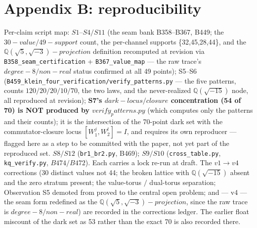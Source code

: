 \documentclass[11pt]{article}
\theoremstyle{plain}
\theoremstyle{definition}
\theoremstyle{remark}
\begin{document}
\section{Appendix B: reproducibility}

Per-claim script map: \(S1–S4/S11\) (the seam bank B358–B367, B449; the \(30-value/49-support\) count, the per-channel supports \{32,45,28,44\}, and the \(\mathbb{Q}(\sqrt{5},\sqrt{-3})-projection\) definition recomputed at revision via \texttt{B358\_seam\_certification} + \texttt{B367\_value\_map} — the raw trace's \(degree-8/non-real\) status confirmed at all 49 points); S5–S6 (\texttt{B459\_klein\_four\_verification/verify\_patterns.py} — the five patterns, counts \(120/20/20/10/70\), the two laws, and the never-realized \(\mathbb{Q}(\sqrt{-15})\) node, all reproduced at revision); \textbf{S7's \(dark-locus/closure\) concentration (54 of 70) is NOT produced by \(verify_{p}atterns.py\)} (which computes only the patterns and their counts); it is the intersection of the 70-point dark set with the commutator-closure locus \([W_{1}^{j},W_{2}^{l}]=I\), and requires its own reproducer — flagged here as a step to be committed with the paper, not yet part of the reproduced set. \(S8/S12\) (\texttt{br1\_br2.py}, B469); \(S9/S10\) (\texttt{cross\_table.py}, \texttt{kq\_verify.py}, \(B474/B472\)). Each carries a lock re-run at draft. The \(v1\to v4\) corrections (30 distinct values not 44; the broken lattice with \(\mathbb{Q}(\sqrt{-15})\) absent and the zero stratum present; the value-torus \(/\) dual-torus separation; Observation S5 demoted from proved to the central open problem; and — v4 — the seam form redefined as the \(\mathbb{Q}(\sqrt{5},\sqrt{-3})-projection\), since the raw trace is \(degree-8/non-real\)) are recorded in the corrections ledger. The earlier float miscount of the dark set as 53 rather than the exact 70 is also recorded there.
\end{document}
